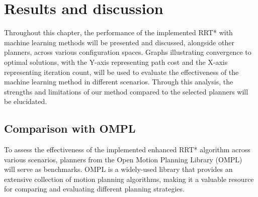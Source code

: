 \documentclass{ctuthesis}
\begin{document}
\chapter{Results and discussion} 
\label{chap:Result} 
Throughout this chapter, 
the performance of the implemented RRT* with machine learning methods will be presented and discussed, 
alongside other planners, across various configuration spaces. 
Graphs illustrating convergence to optimal solutions, 
with the Y-axis representing path cost and the X-axis representing iteration count, 
will be used to evaluate the effectiveness of the machine learning method in different scenarios.
Through this analysis, 
the strengths and limitations of our method compared to the selected planners will be elucidated.
\section{Comparison with OMPL}
To assess the effectiveness of the implemented enhanced RRT* algorithm across various scenarios, 
planners from the Open Motion Planning Library (OMPL)~\cite{Ioan2012ompl} 
will serve as benchmarks. 
OMPL is a widely-used library that provides an extensive collection of motion planning algorithms,
making it a valuable resource for comparing and evaluating different planning strategies. 
\end{document}
